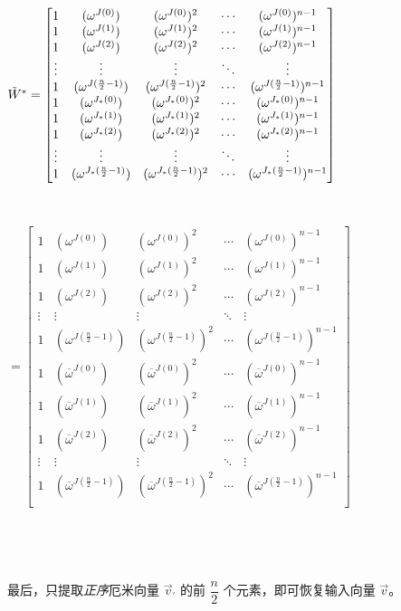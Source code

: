 \begin{tcolorbox}[title={\textbf{\tboxlabel{\ref*{subsec:ckks-encoding-decoding}} CKKS 的编码与解码}}]
\noindent $\tilde{W}^* = \begin{bmatrix}
1 & (\omega^{J(0)}) & (\omega^{J(0)})^2 & \cdots & (\omega^{J(0)})^{n-1}\\
1 & (\omega^{J(1)}) & (\omega^{J(1)})^2 & \cdots & (\omega^{J(1)})^{n-1}\\
1 & (\omega^{J(2)}) & (\omega^{J(2)})^2 & \cdots & (\omega^{J(2)})^{n-1}\\
\vdots & \vdots & \vdots & \ddots & \vdots \\
1 & (\omega^{J(\frac{n}{2}-1)}) & (\omega^{J(\frac{n}{2}-1)})^2 & \cdots & (\omega^{J(\frac{n}{2}-1)})^{n-1}\\
1 & (\omega^{J_*(0)}) & (\omega^{J_*(0)})^2 & \cdots & (\omega^{J_*(0)})^{n-1}\\
1 & (\omega^{J_*(1)}) & (\omega^{J_*(1)})^2 & \cdots & (\omega^{J_*(1)})^{n-1}\\
1 & (\omega^{J_*(2)}) & (\omega^{J_*(2)})^2 & \cdots & (\omega^{J_*(2)})^{n-1}\\
\vdots & \vdots & \vdots & \ddots & \vdots \\
1 & (\omega^{J_*(\frac{n}{2}-1)}) & (\omega^{J_*(\frac{n}{2}-1)})^2 & \cdots & (\omega^{J_*(\frac{n}{2}-1)})^{n-1}\\
\end{bmatrix}$

$ $

\noindent $ = \begin{bmatrix}
1 & (\omega^{J(0)}) & (\omega^{J(0)})^2 & \cdots & (\omega^{J(0)})^{n-1}\\
1 & (\omega^{J(1)}) & (\omega^{J(1)})^2 & \cdots & (\omega^{J(1)})^{n-1}\\
1 & (\omega^{J(2)}) & (\omega^{J(2)})^2 & \cdots & (\omega^{J(2)})^{n-1}\\
\vdots & \vdots & \vdots & \ddots & \vdots \\
1 & (\omega^{J(\frac{n}{2}-1)}) & (\omega^{J(\frac{n}{2}-1)})^2 & \cdots & (\omega^{J(\frac{n}{2}-1)})^{n-1}\\
1 & (\overline\omega^{J(0)}) & (\overline\omega^{J(0)})^2 & \cdots & (\overline\omega^{J(0)})^{n-1}\\
1 & (\overline\omega^{J(1)}) & (\overline\omega^{J(1)})^2 & \cdots & (\overline\omega^{J(1)})^{n-1}\\
1 & (\overline\omega^{J(2)}) & (\overline\omega^{J(2)})^2 & \cdots & (\overline\omega^{J(2)})^{n-1}\\
\vdots & \vdots & \vdots & \ddots & \vdots \\
1 & (\overline\omega^{J(\frac{n}{2}-1)}) & (\overline\omega^{J(\frac{n}{2}-1)})^2 & \cdots & (\overline\omega^{J(\frac{n}{2}-1)})^{n-1}\\
\end{bmatrix}$

$ $

$ $

最后，只提取\textit{正序}厄米向量 $\vec{v}_{'}$ 的前 $\dfrac{n}{2}$ 个元素，即可恢复输入向量 $\vec{v}$。

\end{tcolorbox}

